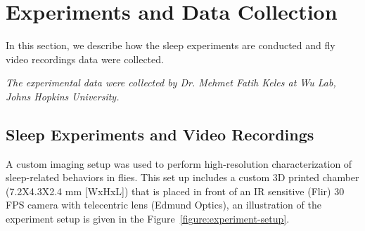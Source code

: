 \setlength{\parindent}{0pt}
\chapter{Experiments and Data Collection}\label{chapter:expt-data-collection}
In this section, we describe how the sleep experiments are conducted and fly video recordings data were collected.

\textit{The experimental data were collected by Dr. Mehmet Fatih Keles at Wu Lab, Johns Hopkins University.}

\section{Sleep Experiments and Video Recordings}
A custom imaging setup was used to perform high-resolution characterization of sleep-related behaviors in flies.
This set up includes a custom 3D printed chamber (7.2X4.3X2.4 mm [WxHxL]) that is placed in front of an IR sensitive (Flir) 30 FPS camera with telecentric lens (Edmund Optics), an illustration of the experiment setup is given in the Figure~\ref{figure:experiment-setup}.

